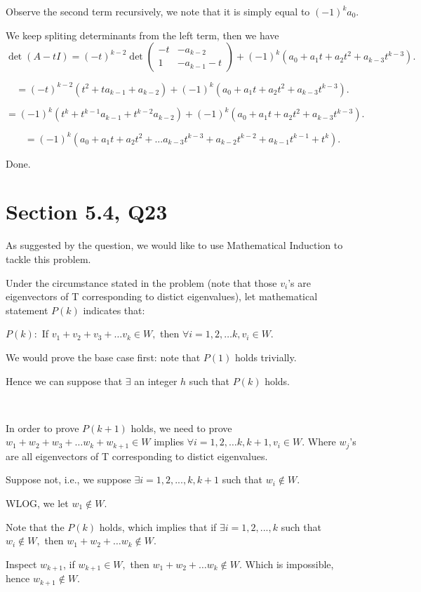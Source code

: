 \documentclass[12pt]{article}%
\begin{document}
Observe the second term recursively, we note that it is simply equal to $(-1)^k a_0.$

We keep spliting determinants from the left term, then we have $$\det (A-tI)=(-t)^{k-2}\det \begin{pmatrix} -t&-a_{k-2}\\1&-a_{k-1}-t\end{pmatrix}+(-1)^k (a_0+a_1t+ a_2 t^2 + a_{k-3}t^{k-3}).$$

$$=(-t)^{k-2}(t^2+ta_{k-1}+a_{k-2})+(-1)^k (a_0+a_1t+ a_2 t^2 + a_{k-3}t^{k-3}).$$

$$=(-1)^{k}(t^k + t^{k-1}a_{k-1} + t^{k-2}a_{k-2})+(-1)^k (a_0+a_1t+ a_2 t^2 + a_{k-3}t^{k-3}).$$

$$=(-1)^k (a_0 + a_1 t + a_2 t^2 +...a_{k-3}t^{k-3} +a_{k-2}t^{k-2}+a_{k-1}t^{k-1} + t^k ).$$

Done.

\section{Section 5.4, Q23}

As suggested by the question, we would like to use Mathematical Induction to tackle this problem.

Under the circumstance stated in the problem (note that those $v_i$'s are eigenvectors of T corresponding to distict eigenvalues), let mathematical statement $P(k)$ indicates that: 

$P(k):$ If $v_1+v_2+v_3+\dots v_k \in W,$ then $\forall i=1,2,\dots k, v_i \in W.$ 

We would prove the base case first: note that $P(1)$ holds trivially. 

Hence we can suppose that $\exists$ an integer $h$ such that $P(k)$ holds.

~\ 

In order to prove $P(k+1)$ holds, we need to prove $w_1+w_2+w_3+\dots w_k + w_{k+1} \in W$ implies $\forall i=1,2,\dots k, k+1,  v_i \in W.$ Where $w_j$'s are all eigenvectors of T corresponding to distict eigenvalues.

Suppose not, i.e., we suppose $\exists i=1,2,...,k,k+1$ such that $w_i \notin W$. 

WLOG, we let $w_1 \notin W.$

Note that the $P(k)$ holds, which implies that if $\exists i=1,2,...,k$ such that $w_i \notin W,$ then $w_1+w_2+\dots w_k \notin W.$

Inspect $w_{k+1}$, if $w_{k+1}\in W,$ then $w_1+w_2+\dots w_k \notin W.$ Which is impossible, hence $w_{k+1} \notin W.$
\end{document}
